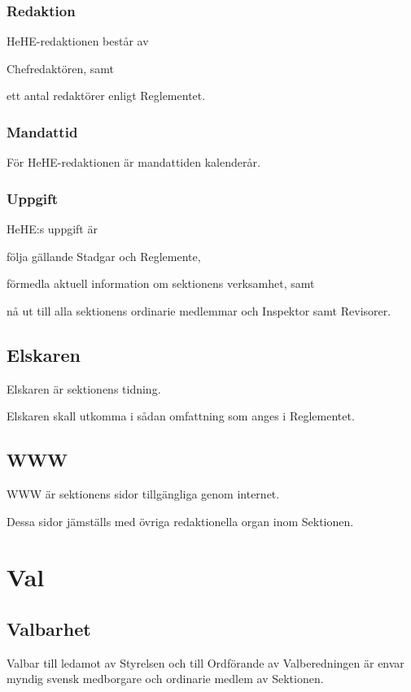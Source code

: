 \documentclass[10pt]{article}
\begin{document}
\subsubsection{Redaktion}
HeHE-redaktionen består av
\begin{alphlist}
\item Chefredaktören, samt
\item ett antal redaktörer enligt Reglementet.
\end{alphlist}

\subsubsection{Mandattid}
För HeHE-redaktionen är mandattiden kalenderår.

\subsubsection{Uppgift}
HeHE:s uppgift är

\begin{attlist}
\item följa gällande Stadgar och Reglemente,
\item förmedla aktuell information om sektionens verksamhet, samt
\item nå ut till alla sektionens ordinarie medlemmar och Inspektor samt
    Revisorer.
\end{attlist}

\subsection{Elskaren}
Elskaren är sektionens tidning.

Elskaren skall utkomma i sådan omfattning som anges i Reglementet.

\subsection{WWW}
WWW är sektionens sidor tillgängliga genom internet.

Dessa sidor jämställs med övriga redaktionella organ inom Sektionen.
\newpage

\section{Val}
\subsection{Valbarhet}
Valbar till ledamot av Styrelsen och till Ordförande av Valberedningen är envar myndig svensk medborgare och ordinarie medlem av Sektionen.
\end{document}
